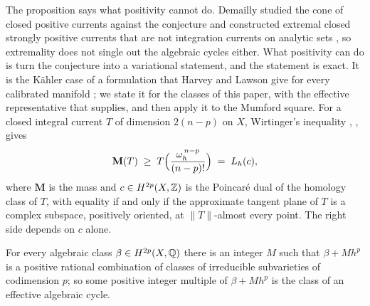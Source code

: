 The proposition says what positivity cannot do. Demailly studied the cone of
closed positive currents against the conjecture and constructed extremal
closed strongly positive currents that are not integration currents on
analytic sets \cite{Dem82}, so extremality does not single out the algebraic
cycles either. What positivity can do is turn the conjecture into a
variational statement, and the statement is exact. It is the K\"ahler case of
a formulation that Harvey and Lawson give for every calibrated manifold
\cite[Section~6, Proposition~6.13 and Remarks~6.9 and~6.11]{HL09}; we state
it for the classes of this paper, with the effective representative that
 supplies, and then apply it to the Mumford square. For a
closed integral current $T$ of dimension $2(n-p)$ on $X$, Wirtinger's
inequality \cite[1.8.2]{Fed69}, \cite{HK74}, \cite[II.3]{HL82} gives
\begin{equation}\label{eq:wirtinger}
  \mathbf{M}(T)\;\ge\;T\Bigl(\frac{\omega_{h}^{\,n-p}}{(n-p)!}\Bigr)
  \;=\;L_{h}(c),
\end{equation}
where $\mathbf{M}$ is the mass and $c\in H^{2p}(X,\mathbb{Z})$ is the Poincar\'e dual
of the homology class of $T$, with equality if and only if the approximate
tangent plane of $T$ is a complex subspace, positively oriented, at
$\|T\|$-almost every point. The right side depends on $c$ alone.

\begin{lemma}\label{lem:cibig}
For every algebraic class $\beta\in H^{2p}(X,\mathbb{Q})$ there is an integer $M$ such
that $\beta+Mh^{p}$ is a positive rational combination of classes of
irreducible subvarieties of codimension $p$; so some positive integer multiple
of $\beta+Mh^{p}$ is the class of an effective algebraic cycle.
\end{lemma}

